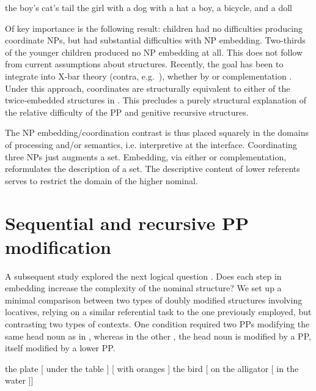 \documentclass[output=paper]{langsci/langscibook}
\begin{document}
\ea\label{ex:bejar:1}
    \ea\label{ex:bejar:1a} the boy’s cat’s tail
    \ex\label{ex:bejar:1b} the girl with a dog with a hat
    \z
\ex\label{ex:bejar:2}
    a boy, a bicycle, and a doll
\z

Of key importance is the following result: children had no difficulties
producing coordinate NPs, but had substantial difficulties with NP embedding.
Two-thirds of the younger children produced no NP embedding at all. This does
not follow from current assumptions about  structures.
Recently, the goal has been to integrate  into X-bar theory
(contra, e.g.\ \citealt{Jackendoff1977}), whether by  \citep{Munn1993}
or complementation \citep{Johannessen1998}. Under this approach, coordinates
are structurally equivalent to either of the twice-embedded structures in
. This precludes a purely structural explanation of the relative
difficulty of the PP and genitive recursive
structures.

The NP embedding/coordination contrast is thus placed squarely in the domains
of processing and/or semantics, i.e. interpretive  at the interface.
Coordinating three NPs just augments a set. Embedding, via either  or
complementation, reformulates the description of a set. The descriptive content
of lower referents serves to restrict the domain of the higher nominal.

\section{Sequential and recursive PP modification}

A subsequent study explored the next logical question
\parencite{Perez-LerouxEtAl2018b}. Does each step in embedding increase the
complexity of the nominal structure? We set up a minimal comparison between two
types of doubly modified structures involving locatives, relying on a similar
referential task to the one previously employed, but contrasting two types of
contexts. One condition required two PPs modifying the same head noun as in
, whereas in the other , the head noun is
modified by a PP, itself modified by a lower PP.

\ea\label{ex:bejar:3}
    \ea\label{ex:bejar:3a} the plate [ under the table ] [ with oranges ]
    \ex\label{ex:bejar:3b} the bird [ on the alligator [ in the water ]]
    \z
\z
\end{document}

